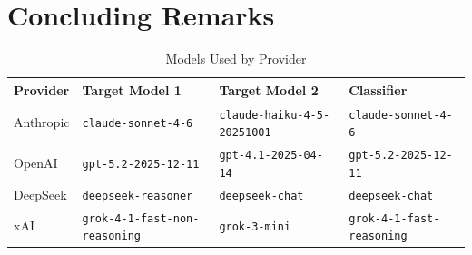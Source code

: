 \documentclass[sigconf]{acmart}
\begin{document}
\section{Concluding Remarks}




\clearpage

\appendix
\setcounter{table}{0}
\renewcommand{\thetable}{A.\arabic{table}}

\begin{table}[h]
    \centering
    \caption{Models Used by Provider}
    \label{tab:models}
    \begin{tabular}{llll}
        \toprule
        \textbf{Provider} & \textbf{Target Model 1} & \textbf{Target Model 2} & \textbf{Classifier} \\
        \midrule
        Anthropic  & \texttt{claude-sonnet-4-6}           & \texttt{claude-haiku-4-5-20251001}  & \texttt{claude-sonnet-4-6}         \\
        OpenAI     & \texttt{gpt-5.2-2025-12-11}          & \texttt{gpt-4.1-2025-04-14}         & \texttt{gpt-5.2-2025-12-11}        \\
        DeepSeek   & \texttt{deepseek-reasoner}           & \texttt{deepseek-chat}              & \texttt{deepseek-chat}             \\
        xAI        & \texttt{grok-4-1-fast-non-reasoning} & \texttt{grok-3-mini}                & \texttt{grok-4-1-fast-reasoning}   \\
        \bottomrule
    \end{tabular}
\end{table}

\onecolumn
\end{document}
